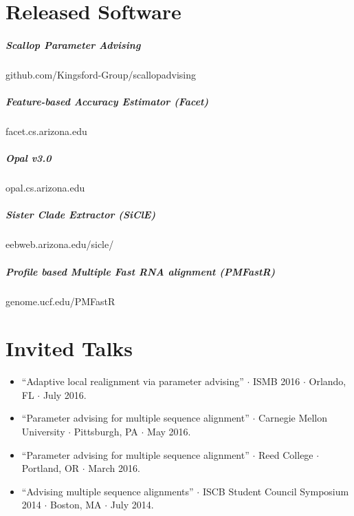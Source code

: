 \documentclass[10pt,letterpaper]{article}
\begin{document}





\section*{Released Software}
\subparagraph{Scallop Parameter Advising}						github.com/Kingsford-Group/scallopadvising
\subparagraph{Feature-based Accuracy Estimator (Facet)} 			facet.cs.arizona.edu
\subparagraph{Opal v3.0}										opal.cs.arizona.edu 
\subparagraph{Sister Clade Extractor (SiClE)}						eebweb.arizona.edu/sicle/
\subparagraph{Profile based Multiple Fast RNA alignment (PMFastR)}	genome.ucf.edu/PMFastR 


\section*{Invited Talks}

\begin{itemize}
    \item ``Adaptive local realignment via parameter advising'' $\cdot$ ISMB 2016 $\cdot$ Orlando, FL $\cdot$ July 2016.
    \item ``Parameter advising for multiple sequence alignment''  $\cdot$ Carnegie Mellon University $\cdot$ Pittsburgh, PA $\cdot$ May 2016. 
    \item ``Parameter advising for multiple sequence alignment''  $\cdot$ Reed College $\cdot$ Portland, OR $\cdot$ March 2016. 
    \item ``Advising multiple sequence alignments'' $\cdot$ ISCB Student Council Symposium 2014 $\cdot$  Boston, MA $\cdot$ July 2014.
   
\end{itemize}
\end{document}
